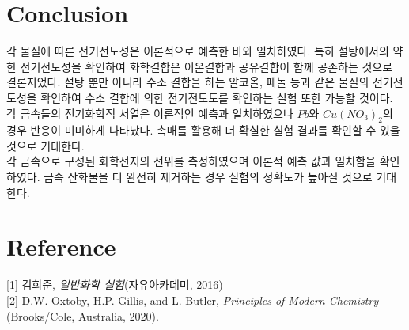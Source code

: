 \documentclass[%
 reprint,
 amsmath,amssymb,
 aps,
]{revtex4-2}
\begin{document}
\section{\label{sec:level1}Conclusion}
각 물질에 따른 전기전도성은 이론적으로 예측한 바와 일치하였다. 특히 설탕에서의 약한 전기전도성을 확인하여 화학결합은 이온결합과 공유결합이 함께 공존하는 것으로 결론지었다. 설탕 뿐만 아니라 수소 결합을 하는 알코올, 페놀 등과 같은 물질의 전기전도성을 확인하여 수소 결합에 의한 전기전도도를 확인하는 실험 또한 가능할 것이다.\\

각 금속들의 전기화학적 서열은 이론적인 예측과 일치하였으나 $Pb$와 $Cu(NO_{3})_{2}$의 경우 반응이 미미하게 나타났다. 촉매를 활용해 더 확실한 실험 결과를 확인할 수 있을 것으로 기대한다.\\

각 금속으로 구성된 화학전지의 전위를 측정하였으며 이론적 예측 값과 일치함을 확인하였다. 금속 산화물을 더 완전히 제거하는 경우 실험의 정확도가 높아질 것으로 기대한다.

\section{\label{sec:level1}Reference}
[1] 김희준, \textit{일반화학 실험}(자유아카데미, 2016)\\

[2] D.W. Oxtoby, H.P. Gillis, and L. Butler, \textit{Principles of Modern Chemistry} (Brooks/Cole, Australia, 2020).
\end{document}

